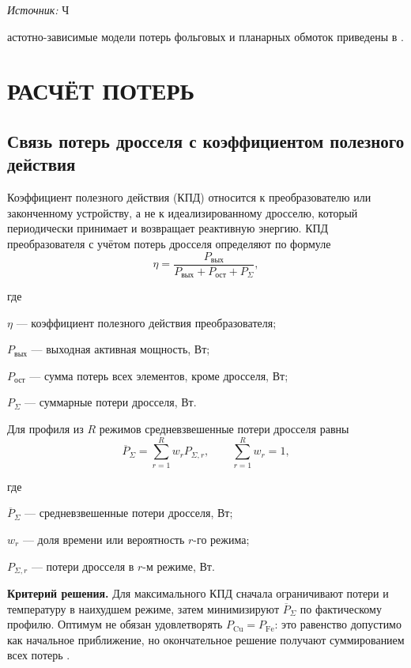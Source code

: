 \documentclass[14pt,a4paper]{extarticle}
\newcommand{\source}[1]{\par\noindent\textit{Источник:} #1\par}
\newcommand{\criterion}{\par\noindent\textbf{Критерий решения.} }
\newenvironment{whereblock}
 {\par\noindent где\par
  \begin{list}{}{\setlength{\leftmargin}{12.5mm}
                  \setlength{\itemindent}{-12.5mm}
                  \setlength{\itemsep}{0pt}
                  \setlength{\parsep}{0pt}
                  \setlength{\topsep}{0pt}}}
 {\end{list}}
\newcommand{\whereitem}[2]{\item[] #1 --- #2}
\begin{document}
\source Частотно-зависимые модели потерь фольговых и планарных обмоток
приведены в \cite{schaefer,ewaldfoil}.

\section{РАСЧЁТ ПОТЕРЬ}
\label{sec:losses}

\subsection{Связь потерь дросселя с коэффициентом полезного действия}

Коэффициент полезного действия (КПД) относится к преобразователю или
законченному устройству, а не к идеализированному дросселю, который
периодически принимает и возвращает реактивную энергию. КПД преобразователя с
учётом потерь дросселя определяют по формуле
\begin{equation}
 \eta=
 \frac{P_{\text{вых}}}
 {P_{\text{вых}}+P_{\text{ост}}+P_{\Sigma}},
 \label{eq:converter-efficiency}
\end{equation}
\begin{whereblock}
\whereitem{$\eta$}{коэффициент полезного действия преобразователя;}
\whereitem{$P_{\text{вых}}$}{выходная активная мощность, Вт;}
\whereitem{$P_{\text{ост}}$}{сумма потерь всех элементов, кроме дросселя,
Вт;}
\whereitem{$P_{\Sigma}$}{суммарные потери дросселя, Вт.}
\end{whereblock}

Для профиля из $R$ режимов средневзвешенные потери дросселя равны
\begin{equation}
 \overline P_{\Sigma}=
 \sum_{r=1}^{R}w_rP_{\Sigma,r},
 \qquad
 \sum_{r=1}^{R}w_r=1,
 \label{eq:mission-profile-loss}
\end{equation}
\begin{whereblock}
\whereitem{$\overline P_{\Sigma}$}{средневзвешенные потери дросселя, Вт;}
\whereitem{$w_r$}{доля времени или вероятность $r$-го режима;}
\whereitem{$P_{\Sigma,r}$}{потери дросселя в $r$-м режиме, Вт.}
\end{whereblock}

\criterion Для максимального КПД сначала ограничивают потери и температуру в
наихудшем режиме, затем минимизируют $\overline P_{\Sigma}$ по фактическому
профилю. Оптимум не обязан удовлетворять
$P_{\text{Cu}}=P_{\text{Fe}}$: это равенство допустимо как начальное
приближение, но окончательное решение получают суммированием всех потерь
\cite{papamanolis,pichon}.
\end{document}
